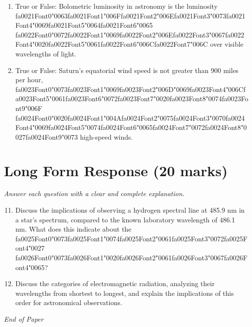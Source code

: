 \documentclass[12pt]{article}
\begin{document}
\begin{enumerate}[label=\arabic*.]
\item True or False: Bolometric luminosity in astronomy is the luminosity {\csname fa0021Font0\endcsname\char"0063}{\csname fa0021Font1\endcsname\char"006F}{\csname fa0021Font2\endcsname\char"006E}{\csname fa0021Font3\endcsname\char"0073}{\csname fa0021Font4\endcsname\char"0069}{\csname fa0021Font5\endcsname\char"0064}{\csname fa0021Font6\endcsname\char"0065} {\csname fa0022Font0\endcsname\char"0072}{\csname fa0022Font1\endcsname\char"0069}{\csname fa0022Font2\endcsname\char"006E}{\csname fa0022Font3\endcsname\char"0067}{\csname fa0022Font4\endcsname\char"0020}{\csname fa0022Font5\endcsname\char"0061}{\csname fa0022Font6\endcsname\char"006C}{\csname fa0022Font7\endcsname\char"006C} over visible wavelengths of light.
\item True or False: Saturn's equatorial wind speed is not greater than 900 miles per hour, {\csname fa0023Font0\endcsname\char"0073}{\csname fa0023Font1\endcsname\char"0069}{\csname fa0023Font2\endcsname\char"006D}{\char"0069}{\csname fa0023Font4\endcsname\char"006C}{\csname fa0023Font5\endcsname\char"0061}{\csname fa0023Font6\endcsname\char"0072}{\csname fa0023Font7\endcsname\char"0020}{\csname fa0023Font8\endcsname\char"0074}{\csname fa0023Font9\endcsname\char"006F} {\csname fa0024Font0\endcsname\char"0020}{\csname fa0024Font1\endcsname\char"004A}{\csname fa0024Font2\endcsname\char"0075}{\csname fa0024Font3\endcsname\char"0070}{\csname fa0024Font4\endcsname\char"0069}{\csname fa0024Font5\endcsname\char"0074}{\csname fa0024Font6\endcsname\char"0065}{\csname fa0024Font7\endcsname\char"0072}{\csname fa0024Font8\endcsname\char"0027}{\csname fa0024Font9\endcsname\char"0073} high-speed winds.
\end{enumerate}

\section*{Long Form Response (20 marks)}
\textit{Answer each question with a clear and complete explanation.}
\begin{enumerate}[label=\arabic*.]
\setcounter{enumi}{10}
\item Discuss the implications of observing a hydrogen spectral line at 485.9 nm in a star's
spectrum, compared to the known laboratory wavelength of 486.1 nm. What does this indicate
about the {\csname fa0025Font0\endcsname\char"0073}{\csname fa0025Font1\endcsname\char"0074}{\csname fa0025Font2\endcsname\char"0061}{\csname fa0025Font3\endcsname\char"0072}{\csname fa0025Font4\endcsname\char"0027} {\csname fa0026Font0\endcsname\char"0073}{\csname fa0026Font1\endcsname\char"0020}{\csname fa0026Font2\endcsname\char"0061}{\csname fa0026Font3\endcsname\char"0067}{\csname fa0026Font4\endcsname\char"0065}?
\item Discuss the categories of electromagnetic radiation, analyzing their wavelengths from
shortest to longest, and explain the implications of this order for astronomical
observations.
\end{enumerate}

\vfill
\noindent\textit{End of Paper}
\end{document}
